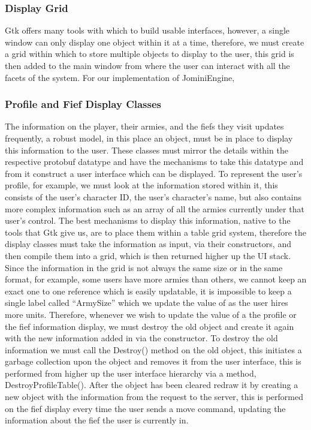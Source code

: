 \documentclass{article}
\begin{document}
\subsubsection{Display Grid}

Gtk offers many tools with which to build usable interfaces, however, a single window can only display one object within it at a time, therefore, we must create a grid within which to store multiple objects to display to the user, this grid is then added to the main window from where the user can interact with all the facets of the system. For our implementation of JominiEngine, 

\subsubsection{Profile and Fief Display Classes}

The information on the player, their armies, and the fiefs they visit updates frequently, a robust model, in this place an object, must be in place to display this information to the user. These classes must mirror the details within the respective protobuf datatype and have the mechanisms to take this datatype and from it construct a user interface which can be displayed. To represent the user’s profile, for example, we must look at the information stored within it, this consists of the user’s character ID, the user’s character’s name, but also contains more complex information such as an array of all the armies currently under that user’s control. The best mechanisms to display this information, native to the tools that Gtk give us, are to place them within a table grid system, therefore the display classes must take the information as input, via their constructors, and then compile them into a grid, which is then returned higher up the UI stack. Since the information in the grid is not always the same size or in the same format, for example, some users have more armies than others, we cannot keep an exact one to one reference which is easily updatable, it is impossible to keep a single label called “ArmySize” which we update the value of as the user hires more units. Therefore, whenever we wish to update the value of a the profile or the fief information display, we must destroy the old object and create it again with the new information added in via the constructor. To destroy the old information we must call the Destroy() method on the old object, this initiates a garbage collection upon the object and removes it from the user interface, this is performed from higher up the user interface hierarchy via a method, DestroyProfileTable(). After the object has been cleared redraw it by creating a new object with the information from the request to the server, this is performed on the fief display every time the user sends a move command, updating the information about the fief the user is currently in.
\end{document}
